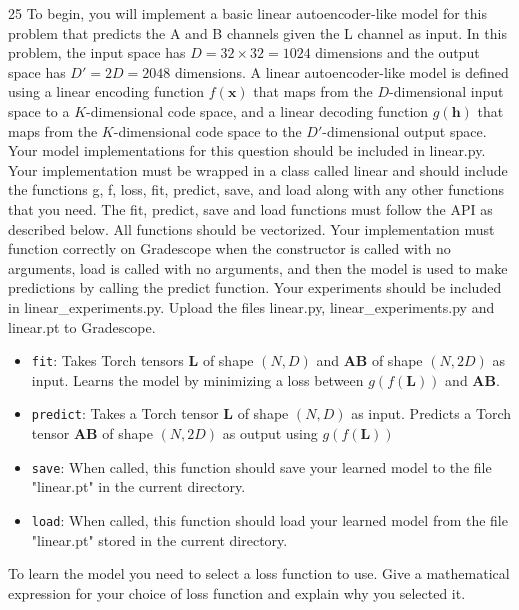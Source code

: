\documentclass[11pt]{article}
\newcommand{\mbf}[1]{{\mathbf{#1}}}
\begin{document}
\begin{problem}{25} To begin, you will implement a basic linear autoencoder-like model for this problem that predicts the A and B channels given the L channel as input. In this problem, the input space has $D=32\times 32=1024$ dimensions and the output space has $D'=2D=2048$ dimensions. A linear autoencoder-like model is defined using a linear encoding function $f(\mbf{x})$ that maps from the $D$-dimensional input space to a $K$-dimensional code space, and a linear decoding function $g(\mbf{h})$ that maps from the $K$-dimensional code space to the $D'$-dimensional output space. \\

Your model implementations for this question should be included in linear.py. Your implementation must be wrapped in a class called linear and should include the functions g, f, loss, fit, predict, save, and load along with any other functions that you need. The fit, predict, save and load functions must follow the API as described below.  All functions should be vectorized. Your implementation must function correctly on Gradescope when the constructor is called with no arguments, load is called with no arguments, and then the model is used to make predictions by calling the predict function. Your experiments should be included in linear\_experiments.py. Upload the files linear.py, linear\_experiments.py and linear.pt to Gradescope.
    
\begin{itemize}
\item \verb|fit|: Takes Torch tensors $\mbf{L}$ of shape $(N,D)$ and $\mbf{AB}$ of shape $(N,2D)$ as input. Learns the model by minimizing a loss between $g(f(\mbf{L}))$ and $\mbf{AB}$. 

\item \verb|predict|: Takes a Torch tensor $\mbf{L}$ of shape $(N,D)$ as input. Predicts a Torch  tensor $\mbf{AB}$ of shape $(N,2D)$ as output using $g(f(\mbf{L}))$

\item \verb|save|: When called, this function should save your learned model to the file "linear.pt" in the current directory. 

\item \verb|load|: When called, this function should load your learned model from the file "linear.pt" stored in the current directory. 

\end{itemize}  

 To learn the model you need to select a loss function to use. Give a mathematical expression for your choice of loss function and explain why you selected it.\\


\end{problem}
\end{document}
